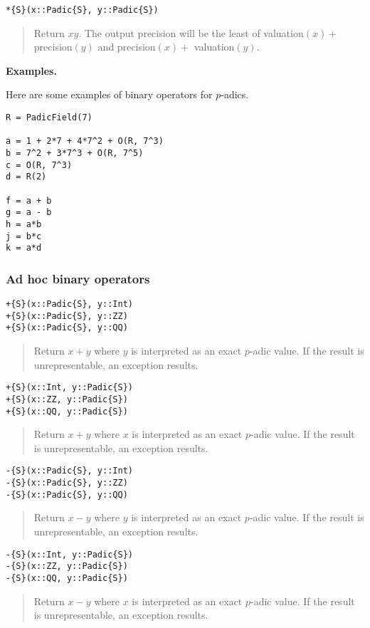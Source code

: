\documentclass[a4paper,10pt]{article}
\newcommand{\desc}[1]{\vspace{-3mm}\begin{quote}#1\end{quote}}
\begin{document}
{{\begin{lstlisting}
*{S}(x::Padic{S}, y::Padic{S})
\end{lstlisting}

\desc{Return $xy$. The output precision will be the least of valuation$(x) +$
precision$(y)$ and precision$(x) +$ valuation$(y)$.}

\textbf{Examples.}

Here are some examples of binary operators for $p$-adics.

\begin{lstlisting}
R = PadicField(7)

a = 1 + 2*7 + 4*7^2 + O(R, 7^3)
b = 7^2 + 3*7^3 + O(R, 7^5)
c = O(R, 7^3)
d = R(2)

f = a + b
g = a - b
h = a*b
j = b*c
k = a*d
\end{lstlisting}

\subsubsection{Ad hoc binary operators}

\begin{lstlisting}
+{S}(x::Padic{S}, y::Int)
+{S}(x::Padic{S}, y::ZZ)
+{S}(x::Padic{S}, y::QQ)
\end{lstlisting}

\desc{Return $x + y$ where $y$ is interpreted as an exact $p$-adic value. If
the result is unrepresentable, an exception results.}

\begin{lstlisting}
+{S}(x::Int, y::Padic{S})
+{S}(x::ZZ, y::Padic{S})
+{S}(x::QQ, y::Padic{S})
\end{lstlisting}

\desc{Return $x + y$ where $x$ is interpreted as an exact $p$-adic value. If
the result is unrepresentable, an exception results.}

\begin{lstlisting}
-{S}(x::Padic{S}, y::Int)
-{S}(x::Padic{S}, y::ZZ)
-{S}(x::Padic{S}, y::QQ)
\end{lstlisting}

\desc{Return $x - y$ where $y$ is interpreted as an exact $p$-adic value. If
the result is unrepresentable, an exception results.}

\begin{lstlisting}
-{S}(x::Int, y::Padic{S})
-{S}(x::ZZ, y::Padic{S})
-{S}(x::QQ, y::Padic{S})
\end{lstlisting}

\desc{Return $x - y$ where $x$ is interpreted as an exact $p$-adic value. If
the result is unrepresentable, an exception results.}

}}
\end{document}
